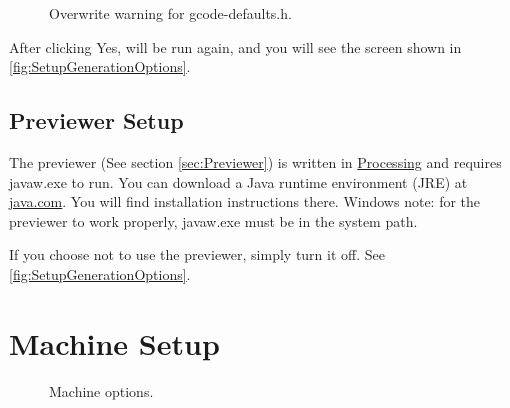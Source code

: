 \documentclass[11pt]{book}
\begin{document}
\begin{figure}
	\caption{Overwrite warning for gcode-defaults.h.}
	\label{fig:GcodeDefaultsWarning}
\end{figure}

After clicking Yes,  will be run again, and you will see the screen shown in \figurename \vref{fig:SetupGenerationOptions}.

\subsection{Previewer Setup}

The previewer (See section \vref{sec:Previewer}) is written in \href{http://www.processing.org}{Processing} and requires javaw.exe to run. You can download a Java runtime environment (JRE) at \href{http://www.java.com}{java.com}. You will find installation instructions there. Windows note: for the previewer to work properly, javaw.exe must be in the system path. 

If you choose not to use the previewer, simply turn it off. See \figurename \vref{fig:SetupGenerationOptions}.



%
%
\section{Machine Setup}\label{sec:MachineSetup}

\begin{figure}
	\caption{Machine options.}
	\label{fig:SetupMachine}
\end{figure}
\end{document}
